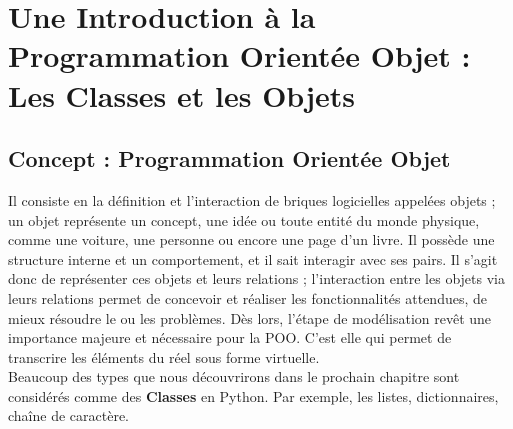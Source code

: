 \documentclass[12pt,fleqn]{report} %
\begin{document}
\pageDeGarde




\pagestyle{empty} %

\clearpage
\setcounter{page}{1}

%

\pagestyle{fancy} %


\setcounter{chapter}{0}









\chapter{Une Introduction à la Programmation Orientée Objet : Les Classes et les Objets}

\section{Concept : Programmation Orientée Objet}


	Il consiste en la définition et l'interaction de briques logicielles appelées objets ; un objet représente un concept, une idée ou toute entité du monde physique, comme une voiture, une personne ou encore une page d'un livre. Il possède une structure interne et un comportement, et il sait interagir avec ses pairs. Il s'agit donc de représenter ces objets et leurs relations ; l'interaction entre les objets via leurs relations permet de concevoir et réaliser les fonctionnalités attendues, de mieux résoudre le ou les problèmes. Dès lors, l'étape de modélisation revêt une importance majeure et nécessaire pour la POO. C'est elle qui permet de transcrire les éléments du réel sous forme virtuelle.\\


Beaucoup des types que nous découvrirons dans le prochain chapitre sont considérés comme des \textbf{Classes} en Python. Par exemple, les listes, dictionnaires, chaîne de caractère.
\end{document}
